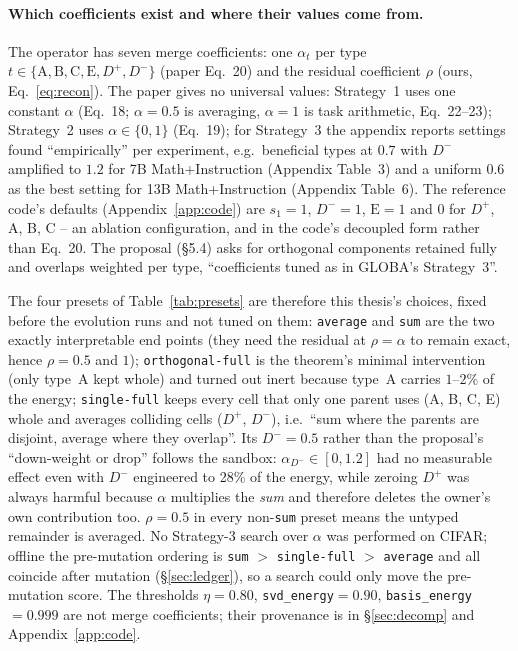 \documentclass[11pt,a4paper]{article}
\newcommand{\Dp}{D^{+}}
\newcommand{\Dm}{D^{-}}
\newcommand{\code}[1]{\texttt{#1}}
\begin{document}
\paragraph{Which coefficients exist and where their values come from.}
The operator has seven merge coefficients: one $\alpha_t$ per type $t\in\{\mathrm{A},\mathrm{B},\mathrm{C},\mathrm{E},\Dp,\Dm\}$ (paper Eq.~20) and the residual coefficient $\rho$ (ours, Eq.~\ref{eq:recon}). The paper gives no universal values: Strategy~1 uses one constant $\alpha$ (Eq.~18; $\alpha=0.5$ is averaging, $\alpha=1$ is task arithmetic, Eq.~22--23); Strategy~2 uses $\alpha\in\{0,1\}$ (Eq.~19); for Strategy~3 the appendix reports settings found ``empirically'' per experiment, e.g.\ beneficial types at $0.7$ with $\Dm$ amplified to $1.2$ for 7B Math+Instruction (Appendix Table~3) and a uniform $0.6$ as the best setting for 13B Math+Instruction (Appendix Table~6). The reference code's defaults (Appendix~\ref{app:code}) are $s_1=1$, $\Dm=1$, $\mathrm{E}=1$ and $0$ for $\Dp$, A, B, C -- an ablation configuration, and in the code's decoupled form rather than Eq.~20. The proposal (\S5.4) asks for orthogonal components retained fully and overlaps weighted per type, ``coefficients tuned as in GLOBA's Strategy~3''.

The four presets of Table~\ref{tab:presets} are therefore this thesis's choices, fixed before the evolution runs and not tuned on them: \code{average} and \code{sum} are the two exactly interpretable end points (they need the residual at $\rho=\alpha$ to remain exact, hence $\rho=0.5$ and $1$); \code{orthogonal-full} is the theorem's minimal intervention (only type~A kept whole) and turned out inert because type~A carries $1$--$2\%$ of the energy; \code{single-full} keeps every cell that only one parent uses (A, B, C, E) whole and averages colliding cells ($\Dp$, $\Dm$), i.e.\ ``sum where the parents are disjoint, average where they overlap''. Its $\Dm=0.5$ rather than the proposal's ``down-weight or drop'' follows the sandbox: $\alpha_{\Dm}\in[0,1.2]$ had no measurable effect even with $\Dm$ engineered to 28\% of the energy, while zeroing $\Dp$ was always harmful because $\alpha$ multiplies the \emph{sum} and therefore deletes the owner's own contribution too. $\rho=0.5$ in every non-\code{sum} preset means the untyped remainder is averaged. No Strategy-3 search over $\alpha$ was performed on CIFAR; offline the pre-mutation ordering is \code{sum} $>$ \code{single-full} $>$ \code{average} and all coincide after mutation (\S\ref{sec:ledger}), so a search could only move the pre-mutation score. The thresholds $\eta=0.80$, \code{svd\_energy}$=0.90$, \code{basis\_energy}$=0.999$ are not merge coefficients; their provenance is in \S\ref{sec:decomp} and Appendix~\ref{app:code}.
\end{document}
